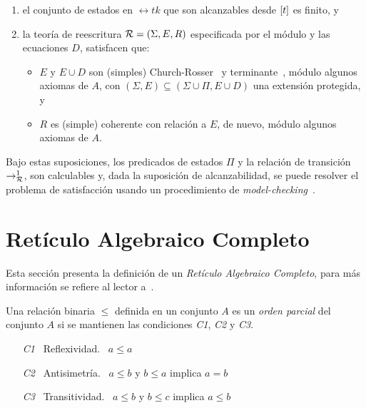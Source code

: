 \begin{enumerate}
   \item el conjunto de estados en $\rel{t}{k}$ que son alcanzables desde
	$[t]$ es finito, y

   \item la teor\'ia de reescritura $\mathcal{R} = (\Sigma,E,R)$ especificada
	por el m\'odulo  y las ecuaciones $D$, satisfacen que:
	\begin{itemize}
	   \item $E$ y $E \cup D$ son (simples) Church-Rosser~\cite{DBLP:journals/jlp/DuranM12}
		y terminante~\cite{Lucas2009207}, m\'odulo algunos axiomas
		de $A$, con $(\Sigma,E) \subseteq (\Sigma \cup \Pi, E \cup D)$
		una extensi\'on protegida, y

	   \item $R$ es (simple) coherente con relaci\'on a $E$, de nuevo,
		m\'odulo algunos axiomas de $A$.
	\end{itemize}
\end{enumerate}

Bajo estas suposiciones, los predicados de estados $\Pi$ y la relaci\'on de 
transici\'on $\rightarrow_{\mathcal{R}}^{1}$, son calculables y, dada la suposici\'on de
alcanzabilidad, se puede resolver el problema de satisfacci\'on usando un
procedimiento de {\em model-checking}~\cite{clarke-book}.

\section{Ret\'iculo Algebraico Completo}
\label{rac.prelim}

Esta secci\'on presenta la definici\'on de un \textit{Ret\'iculo Algebraico Completo}, 
para m\'as informaci\'on se refiere al lector a~\cite{burris1981course}. 

Una relaci\'on binaria $\leq$ definida en un conjunto $A$ es un 
\textit{orden parcial} del conjunto $A$ si se mantienen las 
condiciones \textit{C1}, \textit{C2} y \textit{C3}.

\begin{enumerate}  
	\item [\it{C1}] \ Reflexividad. \ $a \leq a$
	\item [\it{C2}] \ Antisimetr\'ia. \ $a \leq b$ y $b \leq a$ implica $a = b$
	\item [\it{C3}] \ Transitividad. \ $a \leq b$ y $b \leq c$ implica $a \leq b$
\end{enumerate}

